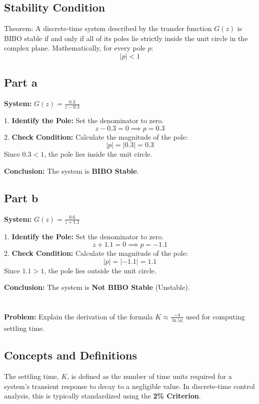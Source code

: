 \documentclass[a4paper,12pt]{article}
\begin{document}
\subsection{Stability Condition}
Theorem: A discrete-time system described by the transfer function $G(z)$ is BIBO stable if and only if all of its poles lie strictly inside the unit circle in the complex plane. Mathematically, for every pole $p$:
$$ |p| < 1 $$

\subsection{Part a}
\textbf{System:} $G(z) = \frac{0.3}{z - 0.3}$

1.  \textbf{Identify the Pole:} Set the denominator to zero.
    $$ z - 0.3 = 0 \implies p = 0.3 $$
2.  \textbf{Check Condition:}
    Calculate the magnitude of the pole:
    $$ |p| = |0.3| = 0.3 $$
    Since $0.3 < 1$, the pole lies inside the unit circle.

\textbf{Conclusion:} The system is \textbf{BIBO Stable}.

\subsection{Part b}
\textbf{System:} $G(z) = \frac{0.6}{z + 1.1}$

1.  \textbf{Identify the Pole:} Set the denominator to zero.
    $$ z + 1.1 = 0 \implies p = -1.1 $$
2.  \textbf{Check Condition:}
    Calculate the magnitude of the pole:
    $$ |p| = |-1.1| = 1.1 $$
    Since $1.1 > 1$, the pole lies outside the unit circle.

\textbf{Conclusion:} The system is \textbf{Not BIBO Stable} (Unstable).


\section{}

\textbf{Problem:} Explain the derivation of the formula $K \approx \frac{-4}{\ln|a|}$ used for computing settling time.

\subsection{Concepts and Definitions}
The settling time, $K$, is defined as the number of time units required for a system's transient response to decay to a negligible value. In discrete-time control analysis, this is typically standardized using the \textbf{2\% Criterion}.
\end{document}
